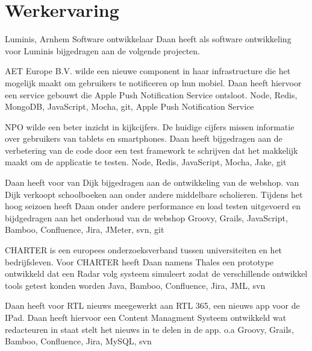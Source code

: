 \section*{Werkervaring}
	\begin{workExperience}{Luminis, Arnhem}%
	{Software ontwikkelaar}{}
		Daan heeft als software ontwikkeling voor Luminis bijgedragen aan de
		volgende projecten.

		AET Europe B.V. wilde een nieuwe component in haar
                infrastructure die het mogelijk maakt om gebruikers te
                notificeren op hun mobiel. Daan heeft hiervoor een
                service gebouwt die Apple Push Notification Service
                ontsloot.
                \technics Node, Redis, MongoDB, JavaScript, Mocha,
                git, Apple Push Notification Service

                NPO wilde een beter inzicht in kijkcijfers. De huidige
                cijfers missen informatie over gebruikers van tablets
                en smartphones. Daan heeft bijgedragen aan de
                verbetering van de code door een test framework te
                schrijven dat het makkelijk maakt om de applicatie te
                testen.
                \technics Node, Redis, JavaScript, Mocha, Jake, git

                Daan heeft voor van Dijk bijgedragen aan de
                ontwikkeling van de webshop. van Dijk verkoopt
                schoolboeken aan onder andere middelbare
                scholieren. Tijdens het hoog seizoen heeft Daan onder
                andere performance en load testen uitgevoerd en
                bijdgedragen aan het onderhoud van de webshop
                \technics Groovy, Grails, JavaScript, Bamboo,
                Confluence, Jira, JMeter, svn, git

                CHARTER is een europees onderzoeksverband tussen
                universiteiten en het bedrijfsleven. Voor CHARTER
                heeft Daan namens Thales een prototype ontwikkeld dat
                een Radar volg systeem simuleert zodat de
                verschillende ontwikkel tools getest konden worden
                \technics Java, Bamboo, Confluence, Jira, JML, svn

                Daan heeft voor RTL nieuws meegewerkt aan RTL 365, een
                nieuws app voor de IPad. Daan heeft hiervoor een
                Content Managment Systeem ontwikkeld wat redacteuren
                in staat stelt het nieuws in te delen in de app.
                \technics o.a Groovy, Grails, Bamboo, Confluence,
                Jira, MySQL, svn
	\end{workExperience}

